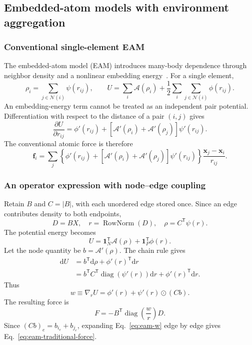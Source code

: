 \documentclass[11pt,a4paper]{article}
\newcommand{\ones}{\mathbf 1}
\newcommand{\dd}{\mathrm d}
\newcommand{\diag}{\operatorname{diag}}
\newcommand{\vect}[1]{\bm{#1}}
\theoremstyle{definition}
\begin{document}
\subsection{Embedded-atom models with environment aggregation}
\label{sec:eam}
\subsubsection{Conventional single-element EAM}
The embedded-atom model (EAM) introduces many-body dependence through neighbor density and a
nonlinear embedding energy~\cite{daw1984,lammps-eam}. For a single element,
\begin{equation}
\rho_i=\sum_{j\in\mathcal N(i)}\psi(r_{ij}),\qquad
U=\sum_i\mathcal A(\rho_i)+\frac12\sum_i\sum_{j\in\mathcal N(i)}\phi(r_{ij}).
\label{eq:eam-traditional}
\end{equation}
An embedding-energy term cannot be treated as an independent pair potential. Differentiation
with respect to the distance of a pair $(i,j)$ gives
\begin{equation}
\frac{\partial U}{\partial r_{ij}}
=\phi'(r_{ij})+
\left[\mathcal A'(\rho_i)+\mathcal A'(\rho_j)\right]\psi'(r_{ij}).
\end{equation}
The conventional atomic force is therefore
\begin{equation}
\vect f_i=\sum_j
\left\{\phi'(r_{ij})+
[\mathcal A'(\rho_i)+\mathcal A'(\rho_j)]\psi'(r_{ij})\right\}
\frac{\vect x_j-\vect x_i}{r_{ij}}.
\label{eq:eam-traditional-force}
\end{equation}

\subsubsection{An operator expression with node--edge coupling}
Retain $B$ and $C=|B|$, with each unordered edge stored once. Since an edge contributes density
to both endpoints,
\begin{equation}
D=BX,\quad r=\operatorname{RowNorm}(D),\quad
\rho=C^{\mathsf T}\psi(r).
\label{eq:eam-density}
\end{equation}
The potential energy becomes
\begin{equation}
U=\ones_N^{\mathsf T}\mathcal A(\rho)+\ones_P^{\mathsf T}\phi(r).
\end{equation}
Let the node quantity be $b=\mathcal A'(\rho)$. The chain rule gives
\begin{align}
\dd U
&=b^{\mathsf T}\dd\rho+\phi'(r)^{\mathsf T}\dd r\\
&=b^{\mathsf T}C^{\mathsf T}\diag(\psi'(r))\dd r
+\phi'(r)^{\mathsf T}\dd r.\nonumber
\end{align}
Thus
\begin{equation}
w\equiv\nabla_rU=\phi'(r)+\psi'(r)\odot(Cb).
\label{eq:eam-w}
\end{equation}
The resulting force is
\begin{equation}
F=-B^{\mathsf T}\diag\!\left(\frac{w}{r}\right)D.
\label{eq:eam-force}
\end{equation}
Since $(Cb)_e=b_{i_e}+b_{j_e}$, expanding Eq.~\eqref{eq:eam-w} edge by edge gives
Eq.~\eqref{eq:eam-traditional-force}.
\end{document}
